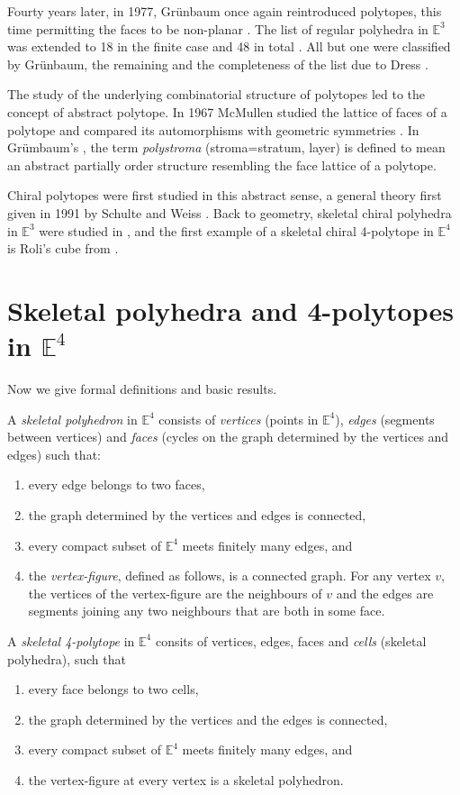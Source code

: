 \documentclass{article}
\theoremstyle{definition}
\newcommand{\E}{\mathbb{E}}
\begin{document}
	Fourty years later, in 1977, Grünbaum once again reintroduced polytopes, this time permitting the faces to be non-planar \cite{grunbaum}. The list of regular polyhedra in $\E^3$ was extended to 18 in the finite case and 48 in total \cite{regular-ordinary}. All but one were classified by Grünbaum, the remaining and the completeness of the list due to Dress \cite{Dress1981,Dress1985}.
	
	The study of the underlying combinatorial structure of polytopes led to the concept of abstract polytope. In 1967 McMullen studied the lattice of faces of a polytope and compared its automorphisms with geometric symmetries \cite{mcmullen-combinatorially}. In Grümbaum's \cite{grunbaum-regularity}, the term \textit{polystroma} (stroma=stratum, layer) is defined to mean an abstract partially order structure resembling the face lattice of a polytope.
	
	Chiral polytopes were first studied in this abstract sense, a general theory first given in 1991 by Schulte and Weiss \cite{schulte-chiral}. Back to geometry, skeletal chiral polyhedra in $\E^3$ were studied in \cite{chiral-polyhedra-i,chiral-polyhedra-ii}, and the first example of a skeletal chiral 4-polytope in $\E^4$ is Roli's cube from \cite{rolis-cube}.
	
	\section{Skeletal polyhedra and 4-polytopes in $\E^4$}\label{sec:skeletal}
	Now we give formal definitions and basic results.
	
	A \textit{skeletal polyhedron} in $\E^4$ consists of \textit{vertices} (points in $\E^4$), \textit{edges} (segments between vertices) and \textit{faces} (cycles on the graph determined by the vertices and edges) such that:
	\begin{enumerate}[\itshape(i)]
		\item every edge belongs to two faces,
		\item the graph determined by the vertices and edges is connected,
		\item every compact subset of $\E^4$ meets finitely many edges, and
		\item the \textit{vertex-figure}, defined as follows, is a connected graph. For any vertex $v$, the vertices of the vertex-figure are the neighbours of $v$ and the edges are segments joining any two neighbours that are both in some face.
	\end{enumerate}
	A \textit{skeletal 4-polytope} in $\E^4$ consits of vertices, edges, faces and \textit{cells} (skeletal polyhedra), such that
	\begin{enumerate}[\itshape(i)]
		\item every face belongs to two cells,
		\item the graph determined by the vertices and the edges is connected,
		\item every compact subset of $\E^4$ meets finitely many edges, and
		\item the vertex-figure at every vertex is a skeletal polyhedron.
		\end{enumerate}
	
\end{document}
